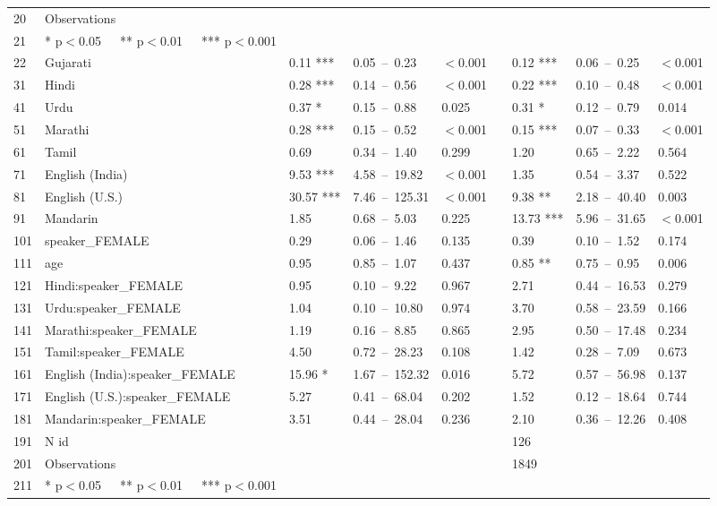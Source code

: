 \begin{table}[ht]
\begin{tabular}{}
  20 & Observations &  &  &  &  &  &  &  \\ 
  21 & * p$<$0.05   ** p$<$0.01   *** p$<$0.001 &  &  &  &  &  &  &  \\ 
  22 & Gujarati & 0.11 *** & 0.05 – 0.23 & $<$0.001 &  & 0.12 *** & 0.06 – 0.25 & $<$0.001 \\ 
  31 & Hindi & 0.28 *** & 0.14 – 0.56 & $<$0.001 &  & 0.22 *** & 0.10 – 0.48 & $<$0.001 \\ 
  41 & Urdu & 0.37 * & 0.15 – 0.88 & 0.025 &  & 0.31 * & 0.12 – 0.79 & 0.014 \\ 
  51 & Marathi & 0.28 *** & 0.15 – 0.52 & $<$0.001 &  & 0.15 *** & 0.07 – 0.33 & $<$0.001 \\ 
  61 & Tamil & 0.69 & 0.34 – 1.40 & 0.299 &  & 1.20 & 0.65 – 2.22 & 0.564 \\ 
  71 & English (India) & 9.53 *** & 4.58 – 19.82 & $<$0.001 &  & 1.35 & 0.54 – 3.37 & 0.522 \\ 
  81 & English (U.S.) & 30.57 *** & 7.46 – 125.31 & $<$0.001 &  & 9.38 ** & 2.18 – 40.40 & 0.003 \\ 
  91 & Mandarin & 1.85 & 0.68 – 5.03 & 0.225 &  & 13.73 *** & 5.96 – 31.65 & $<$0.001 \\ 
  101 & speaker\_FEMALE & 0.29 & 0.06 – 1.46 & 0.135 &  & 0.39 & 0.10 – 1.52 & 0.174 \\ 
  111 & age & 0.95 & 0.85 – 1.07 & 0.437 &  & 0.85 ** & 0.75 – 0.95 & 0.006 \\ 
  121 & Hindi:speaker\_FEMALE & 0.95 & 0.10 – 9.22 & 0.967 &  & 2.71 & 0.44 – 16.53 & 0.279 \\ 
  131 & Urdu:speaker\_FEMALE & 1.04 & 0.10 – 10.80 & 0.974 &  & 3.70 & 0.58 – 23.59 & 0.166 \\ 
  141 & Marathi:speaker\_FEMALE & 1.19 & 0.16 – 8.85 & 0.865 &  & 2.95 & 0.50 – 17.48 & 0.234 \\ 
  151 & Tamil:speaker\_FEMALE & 4.50 & 0.72 – 28.23 & 0.108 &  & 1.42 & 0.28 – 7.09 & 0.673 \\ 
  161 & English (India):speaker\_FEMALE & 15.96 * & 1.67 – 152.32 & 0.016 &  & 5.72 & 0.57 – 56.98 & 0.137 \\ 
  171 & English (U.S.):speaker\_FEMALE & 5.27 & 0.41 – 68.04 & 0.202 &  & 1.52 & 0.12 – 18.64 & 0.744 \\ 
  181 & Mandarin:speaker\_FEMALE & 3.51 & 0.44 – 28.04 & 0.236 &  & 2.10 & 0.36 – 12.26 & 0.408 \\ 
  191 & N id &  &  &  &  & 126 &  &  \\ 
  201 & Observations &  &  &  &  & 1849 &  &  \\ 
  211 & * p$<$0.05   ** p$<$0.01   *** p$<$0.001 &  &  &  &  &  &  &  \\ 
   \hline
\end{tabular}
\end{table}
